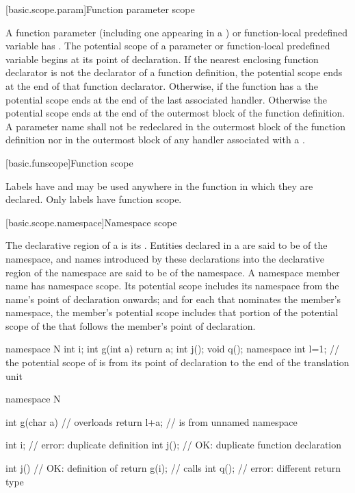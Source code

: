 [basic.scope.param]{Function parameter scope}

\pnum
{}%
%
%
A function parameter
(including one appearing in a
)
or function-local predefined variable
has .
The potential scope of a parameter
or function-local predefined variable
begins at its point of declaration. If
the nearest enclosing function declarator
is not the declarator of a function definition,
the potential scope ends at the end of that function declarator.
Otherwise, if
the function has a  the potential scope
ends at the end of the last associated handler.
Otherwise the potential scope ends
at the end of the outermost block of the function definition. A
parameter name shall not be redeclared in the outermost block of the
function definition nor in the outermost block of any handler associated
with a .

[basic.funscope]{Function scope}

\pnum
{}%
Labels have  and
may be used anywhere in the function in which they are declared. Only
labels have function scope.

[basic.scope.namespace]{Namespace scope}

\pnum
{}%
The declarative region of a  is its
.  Entities declared in a
 are said to be  of the
namespace, and names introduced by these declarations into the
declarative region of the namespace are said to be  of the namespace. A namespace member name has namespace scope.
Its potential scope includes its namespace from the name's point of
declaration onwards; and for each
 that nominates the
member's namespace, the member's potential scope includes that portion
of the potential scope of the  that follows
the member's point of declaration.
\begin{example}

\begin{codeblock}
namespace N {
  int i;
  int g(int a) { return a; }
  int j();
  void q();
}
namespace { int l=1; }
// the potential scope of  is from its point of declaration to the end of the translation unit

namespace N {
  int g(char a) {   // overloads 
    return l+a;     //  is from unnamed namespace
  }

  int i;            // error: duplicate definition
  int j();          // OK: duplicate function declaration

  int j() {         // OK: definition of 
    return g(i);    // calls 
  }
  int q();          // error: different return type
}
\end{codeblock}
\end{example}

